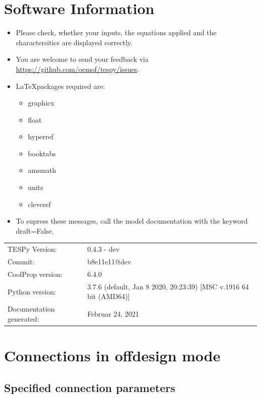 \section*{Software Information}

\begin{itemize}
\item Please check, whether your inputs, the equations applied and the charactersitics are displayed correctly.
\item You are welcome to send your feedback via \url{https://github.com/oemof/tespy/issues}.
\item \LaTeX packages required are:
\begin{itemize}
\item graphicx
\item float
\item hyperref
\item booktabs
\item amsmath
\item units
\item cleveref
\end{itemize}
\item To supress these messages, call the model documentation with the keyword draft=False.
\end{itemize}

\begin{table}[H]
\begin{tabular}{ll}
TESPy Version:&0.4.3 - dev\\
Commit:&b8e11e11@dev\\
CoolProp version:&6.4.0\\
Python version:&3.7.6 (default, Jan  8 2020, 20:23:39) [MSC v.1916 64 bit (AMD64)]\\
Documentation generated:&Februar 24, 2021\\
\end{tabular}
\end{table}
\newpage\section{Connections in offdesign mode}

\subsection{Specified connection parameters}

